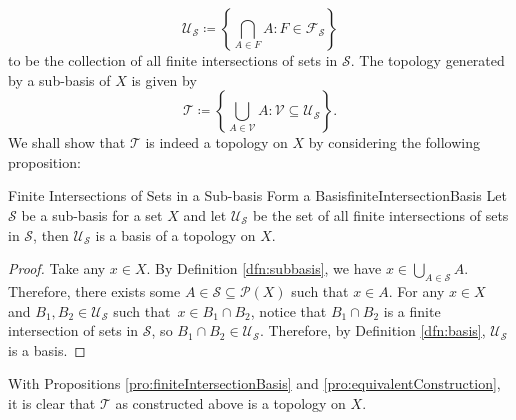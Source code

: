 \documentclass[math, code]{amznotes}
\theoremstyle{remark}
\begin{document}
\begin{equation*}
    \mathcal{U}_{\mathcal{S}} \coloneqq \left\{\bigcap_{A \in F}A \colon F \in \mathcal{F}_{\mathcal{S}}\right\}
\end{equation*}
to be the collection of all finite intersections of sets in $\mathcal{S}$. The topology generated by a sub-basis of $X$ is given by 
\begin{equation*}
    \mathcal{T} \coloneqq \left\{\bigcup_{A \in \mathcal{V}}A  \colon \mathcal{V}\subseteq \mathcal{U}_{\mathcal{S}}\right\}.
\end{equation*}
We shall show that $\mathcal{T}$ is indeed a topology on $X$ by considering the following proposition:
\begin{probox}{Finite Intersections of Sets in a Sub-basis Form a Basis}{finiteIntersectionBasis}
    Let $\mathcal{S}$ be a sub-basis for a set $X$ and let $\mathcal{U}_{\mathcal{S}}$ be the set of all finite intersections of sets in $\mathcal{S}$, then $\mathcal{U}_{\mathcal{S}}$ is a basis of a topology on $X$.
    \tcblower
    \begin{proof}
        Take any $x \in X$. By Definition \ref{dfn:subbasis}, we have $x \in \bigcup_{A \in \mathcal{S}}A$. Therefore, there exists some $A \in \mathcal{S} \subseteq \mathcal{P}\left(X\right)$ such that $x \in A$. For any $x \in X$ and $B_1, B_2 \in \mathcal{U}_{\mathcal{S}}$ such that~$x \in B_1 \cap B_2$, notice that $B_1 \cap B_2$ is a finite intersection of sets in $\mathcal{S}$, so $B_1 \cap B_2 \in \mathcal{U}_{\mathcal{S}}$. Therefore, by Definition \ref{dfn:basis}, $\mathcal{U}_{\mathcal{S}}$ is a basis. 
    \end{proof}
\end{probox}
With Propositions \ref{pro:finiteIntersectionBasis} and \ref{pro:equivalentConstruction}, it is clear that $\mathcal{T}$ as constructed above is a topology on $X$.
\end{document}
